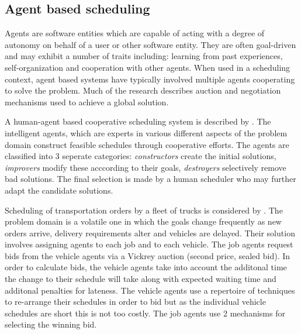 








%
%
\subsection{Agent based scheduling}
\label{sub:review_agent}
Agents are software entities which are capable of acting with a degree of autonomy on behalf of a user or other software entity. They are often goal-driven and may exhibit a number of traits including: learning from past experiences, self-organization and cooperation with other agents. When used in a scheduling context, agent based systems have typically involved multiple agents cooperating to solve the problem. Much of the research describes auction and negotiation mechanisms used to achieve a global solution. 

A human-agent based cooperative scheduling system is described by \citet{murthy97agent}. The intelligent agents, which are experts in various different aspects of the problem domain construct feasible schedules through cooperative efforts. The agents are classified into 3 seperate categories: \emph{constructors} create the initial solutions, \emph{improvers} modify these acccording to their goals, \emph{destroyers} selectively remove bad solutions. The final selection is made by a human scheduler who may further adapt the candidate solutions. 


Scheduling of transportation orders by a fleet of trucks is considered by \citet{mes07comparison}. The problem domain is a volatile one in which the goals change frequently as new orders arrive, delivery requirements alter and vehicles are delayed. Their solution involves assigning agents to each job and to each vehicle. The job agents request bids from the vehicle agents via a Vickrey auction (second price, sealed bid). 
In order to calculate bids, the vehicle agents take into account the additonal time the change to their schedule will take along with expected waiting time and additonal penalties for lateness. The vehicle agents use a repertoire of techniques to re-arrange their schedules in order to bid but as the individual vehicle schedules are short this is not too costly. The job agents use 2 mechanisms for selecting the winning bid. 

